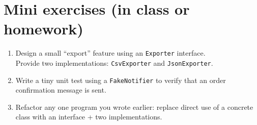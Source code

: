 \documentclass[11pt]{article}
\begin{document}
\section*{Mini exercises (in class or homework)}
\begin{enumerate}
  \item Design a small ``export'' feature using an \texttt{Exporter} interface.\\
        Provide two implementations: \texttt{CsvExporter} and \texttt{JsonExporter}.
  \item Write a tiny unit test using a \texttt{FakeNotifier} to verify that an order confirmation message is sent.
  \item Refactor any one program you wrote earlier: replace direct use of a concrete class with an interface + two implementations.
\end{enumerate}
\end{document}
